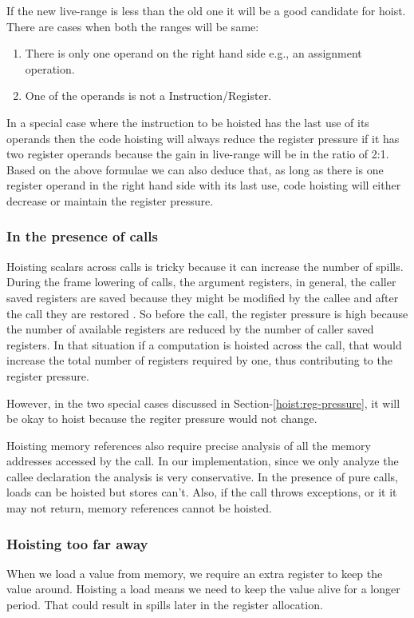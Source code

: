 \documentclass{sig-alternate}
\begin{document}
If the new live-range is less than the old one it will be a good candidate
for hoist. There are cases when both the ranges will be same:
\begin{enumerate}
  \item There is only one operand on the right hand side e.g., an assignment operation.
  \item One of the operands is not a Instruction/Register.
\end{enumerate}

In a special case where the instruction to be hoisted has the last use of its
operands then the code hoisting will always reduce the register pressure if it
has two register operands because the gain in live-range will be in the ratio of
2:1. Based on the above formulae we can also deduce that, as long as there is
one register operand in the right hand side with its last use, code hoisting
will either decrease or maintain the register pressure.

\subsubsection{In the presence of calls}
\label{cost:across-calls}
Hoisting scalars across calls is tricky because it can increase the number of
spills. During the frame lowering of calls, the argument registers, in general,
the caller saved registers are saved because they might be modified by the
callee and after the call they are restored \cite{frame-lowering}. So before the
call, the register pressure is high because the number of available registers
are reduced by the number of caller saved registers. In that situation if a
computation is hoisted across the call, that would increase the total number of
registers required by one, thus contributing to the register pressure.

However, in the two special cases discussed in Section-\ref{hoist:reg-pressure},
it will be okay to hoist because the regiter pressure would not change.

Hoisting memory references also require precise analysis of all the memory
addresses accessed by the call. In our implementation, since we only analyze the
callee declaration the analysis is very conservative. In the presence of pure
calls, loads can be hoisted but stores can't. Also, if the call throws exceptions,
or it it may not return, memory references cannot be hoisted.

\subsubsection{Hoisting too far away}
When we load a value from memory, we require an extra register to keep the value
around. Hoisting a load means we need to keep the value alive for a longer
period. That could result in spills later in the register allocation.
\end{document}
